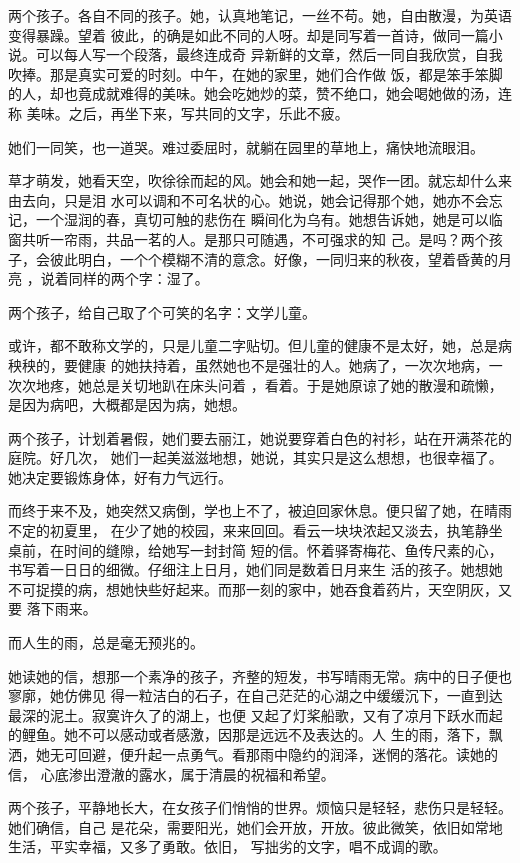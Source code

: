 \documentclass[12pt,a4paper]{article}
\begin{document}
		两个孩子。各自不同的孩子。她，认真地笔记，一丝不苟。她，自由散漫，为英语变得暴躁。望着
	彼此，的确是如此不同的人呀。却是同写着一首诗，做同一篇小说。可以每人写一个段落，最终连成奇
	异新鲜的文章，然后一同自我欣赏，自我吹捧。那是真实可爱的时刻。中午，在她的家里，她们合作做
	饭，都是笨手笨脚的人，却也竟成就难得的美味。她会吃她炒的菜，赞不绝口，她会喝她做的汤，连称
	美味。之后，再坐下来，写共同的文字，乐此不疲。

		她们一同笑，也一道哭。难过委屈时，就躺在园里的草地上，痛快地流眼泪。

		草才萌发，她看天空，吹徐徐而起的风。她会和她一起，哭作一团。就忘却什么来由去向，只是泪
	水可以调和不可名状的心。她说，她会记得那个她，她亦不会忘记，一个湿润的春，真切可触的悲伤在
	瞬间化为乌有。她想告诉她，她是可以临窗共听一帘雨，共品一茗的人。是那只可随遇，不可强求的知
	己。是吗？两个孩子，会彼此明白，一个个模糊不清的意念。好像，一同归来的秋夜，望着昏黄的月亮
	，说着同样的两个字：湿了。

		两个孩子，给自己取了个可笑的名字：文学儿童。

		或许，都不敢称文学的，只是儿童二字贴切。但儿童的健康不是太好，她，总是病秧秧的，要健康
	的她扶持着，虽然她也不是强壮的人。她病了，一次次地病，一次次地疼，她总是关切地趴在床头问着
	，看着。于是她原谅了她的散漫和疏懒，是因为病吧，大概都是因为病，她想。

		两个孩子，计划着暑假，她们要去丽江，她说要穿着白色的衬衫，站在开满茶花的庭院。好几次，
	她们一起美滋滋地想，她说，其实只是这么想想，也很幸福了。她决定要锻炼身体，好有力气远行。

		而终于来不及，她突然又病倒，学也上不了，被迫回家休息。便只留了她，在晴雨不定的初夏里，
	在少了她的校园，来来回回。看云一块块浓起又淡去，执笔静坐桌前，在时间的缝隙，给她写一封封简
	短的信。怀着驿寄梅花、鱼传尺素的心，书写着一日日的细微。仔细注上日月，她们同是数着日月来生
	活的孩子。她想她不可捉摸的病，想她快些好起来。而那一刻的家中，她吞食着药片，天空阴灰，又要
	落下雨来。

		而人生的雨，总是毫无预兆的。

		她读她的信，想那一个素净的孩子，齐整的短发，书写晴雨无常。病中的日子便也寥廓，她仿佛见
	得一粒洁白的石子，在自己茫茫的心湖之中缓缓沉下，一直到达最深的泥土。寂寞许久了的湖上，也便
	又起了灯桨船歌，又有了凉月下跃水而起的鲤鱼。她不可以感动或者感激，因那是远远不及表达的。人
	生的雨，落下，飘洒，她无可回避，便升起一点勇气。看那雨中隐约的润泽，迷惘的落花。读她的信，
	心底渗出澄澈的露水，属于清晨的祝福和希望。

		两个孩子，平静地长大，在女孩子们悄悄的世界。烦恼只是轻轻，悲伤只是轻轻。她们确信，自己
	是花朵，需要阳光，她们会开放，开放。彼此微笑，依旧如常地生活，平实幸福，又多了勇敢。依旧，
	写拙劣的文字，唱不成调的歌。
\end{document}
